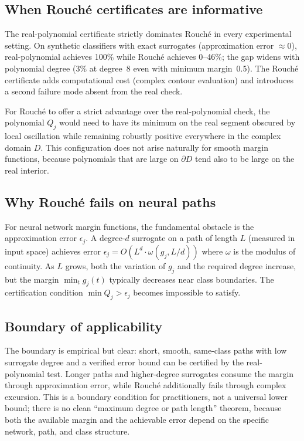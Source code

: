 \documentclass{article}
\theoremstyle{definition}
\begin{document}
\subsection{When Rouch\'e certificates are informative}

The real-polynomial certificate strictly dominates Rouché in every
experimental setting.  On synthetic classifiers with exact surrogates
(approximation error $\approx 0$), real-polynomial achieves 100\% while
Rouché achieves 0--46\%; the gap widens with polynomial degree (3\% at
degree~8 even with minimum margin~0.5).  The Rouché certificate adds
computational cost (complex contour evaluation) and introduces a second
failure mode absent from the real check.

For Rouch\'e to offer a strict advantage over the real-polynomial check, the
polynomial $Q_j$ would need to have its minimum on the real segment obscured by
local oscillation while remaining robustly positive everywhere in the complex
domain $D$.  This configuration does not arise naturally for smooth margin
functions, because polynomials that are large on $\partial D$ tend also to be
large on the real interior.

\subsection{Why Rouch\'e fails on neural paths}

For neural network margin functions, the fundamental obstacle is the
approximation error $\epsilon_j$.  A degree-$d$ surrogate on a path of length
$L$ (measured in input space) achieves error
$\epsilon_j = O(L^d \cdot \omega(g_j, L/d))$
where $\omega$ is the modulus of continuity.  As $L$ grows, both the variation
of $g_j$ and the required degree increase, but the margin $\min_t g_j(t)$
typically decreases near class boundaries.  The certification condition
$\min Q_j > \epsilon_j$ becomes impossible to satisfy.

\subsection{Boundary of applicability}

The boundary is empirical but clear: short, smooth, same-class paths with
low surrogate degree and a verified error bound can be certified by the
real-polynomial test.  Longer paths and higher-degree surrogates consume the
margin through approximation error, while Rouch\'e additionally fails through
complex excursion.  This is a boundary condition for practitioners, not a
universal lower bound; there is no clean ``maximum degree or path length''
theorem, because both the available margin and the achievable error depend on
the specific network, path, and class structure.
\end{document}
